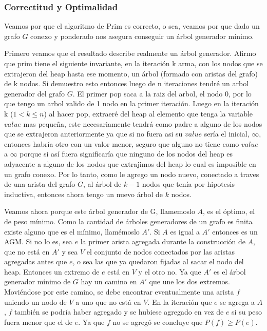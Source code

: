 \subsubsection{Correctitud y Optimalidad}

Veamos por que el algoritmo de Prim es correcto, o sea, veamos por que dado un grafo $G$ conexo y ponderado nos asegura conseguir un árbol generador mínimo.

Primero veamos que el resultado describe realmente un árbol generador. Afirmo que prim tiene el siguiente invariante, en la iteración k arma, con los nodos que se extrajeron del heap hasta ese momento, un árbol (formado con aristas del grafo) de k nodos. Si demuestro esto entonces luego de n iteraciones tendré un arbol generador del grafo $G$. El primer pop saca a la raiz del arbol, el nodo 0, por lo que tengo un arbol valido de 1 nodo en la primer iteración. Luego en la iteración k ($ 1 < k \leq n $) al hacer pop, extraeré del heap al elemento que tenga la variable $value$ mas pequeña, este necesariamente tendrá como padre a alguno de los nodos que se extrajeron anteriormente ya que si no fuera asi su $value$ sería el inicial, $\infty$, entonces habría otro con un valor menor, seguro que alguno no tiene como $value$ a $\infty$ porque si así fuera significaría que ninguno de los nodos del heap es adyacente a alguno de los nodos que extrajimos del heap lo cual es imposible en un grafo conexo. Por lo tanto, como le agrego un nodo nuevo, conectado a traves de una arista del grafo $G$, al árbol de $k-1$ nodos que tenía por hipotesis inductiva, entonces ahora tengo un nuevo árbol de $k$ nodos.

Veamos ahora porque este árbol generador de G, llamemoslo $A$, es el óptimo, el de peso mínimo.
Como la cantidad de árboles generadores de un grafo es finita existe alguno que es el mínimo, llam\'emoslo $A'$.
Si $A$ es igual a $A'$ entonces es un AGM.
Si no lo es, sea $e$ la primer arista agregada durante la construcción de $A$, que no está en $A'$ y sea $V$ el conjunto de nodos conectados por las aristas agregadas antes que $e$, o sea las que ya quedaron fijadas al sacar el nodo del heap.
Entonces un extremo de $e$ está en $V$ y el otro no. Ya que $A'$ es el árbol generador mínimo de $G$ hay un camino en $A'$ que une los dos extremos. Moviéndose por este camino, se debe encontrar eventualmente una arista $f$ uniendo un nodo de $V$ a uno que no está en $V$. En la iteración que $e$ se agrega a $A$, $f$ también se podría haber agregado y se hubiese agregado en vez de $e$ si su peso fuera menor que el de $e$. Ya que $f$ no se agregó se concluye que $P(f) \geq P(e)$.

